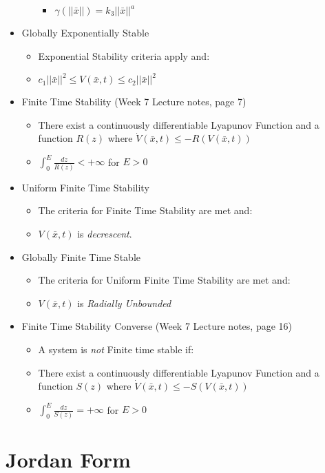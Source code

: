 \documentclass[12pt]{article}
\begin{document}
\begin{itemize}
\begin{itemize}
\begin{itemize}
		\item $\gamma(||\bar{x}||)=k_3||\bar{x}||^a$
		\end{itemize}
	\end{itemize}
\item Globally Exponentially Stable
	\begin{itemize}
	\item Exponential Stability criteria apply and:
	\item $c_1||\bar{x}||^2\leq V(\bar{x},t)\leq c_2||\bar{x}||^2$
	\end{itemize}
\item Finite Time Stability (Week 7 Lecture notes, page 7)
	\begin{itemize}
	\item There exist a continuously differentiable Lyapunov Function and a function $R(z)$ where $\dot{V}(\bar{x},t)\leq-R(V(\bar{x},t))$
	\item $\int_0^E\frac{dz}{R(z)}<+\infty$ for $E>0$
	\end{itemize}
\item Uniform Finite Time Stability
	\begin{itemize}
	\item The criteria for Finite Time Stability are met and: 
	\item $V(\bar{x},t)$ is {\em decrescent}.
	\end{itemize}
\item Globally Finite Time Stable 
	\begin{itemize}
	\item The criteria for Uniform Finite Time Stability are met and: 
	\item $V(\bar{x},t)$ is {\em Radially Unbounded}
	\end{itemize}
\item Finite Time Stability Converse (Week 7 Lecture notes, page 16)
	 \begin{itemize}
	 \item A system is {\em not} Finite time stable if:
	 \item There exist a continuously differentiable Lyapunov Function and a function $S(z)$ where $\dot{V}(\bar{x},t)\leq-S(V(\bar{x},t))$
	 \item $\int_0^E\frac{dz}{S(z)}=+\infty$ for $E>0$
	 \end{itemize}

\end{itemize}

\section*{Jordan Form}
\end{document}
